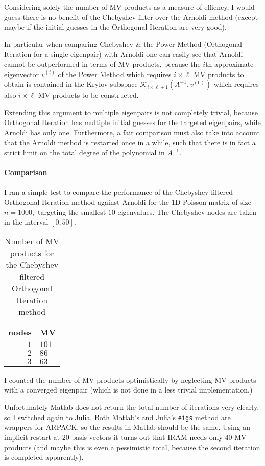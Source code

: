 \documentclass[a4paper]{article}
\newcommand{\ra}[1]{\renewcommand{\arraystretch}{#1}}
\begin{document}
   Considering solely the number of MV products as a measure of effiency, I would guess there is no benefit of the Chebyshev filter over the Arnoldi method (except maybe if the initial guesses in the Orthogonal Iteration are very good). 

   In particular when comparing Chebyshev \& the Power Method (Orthogonal Iteration for a single eigenpair) with Arnoldi one can easily see that Arnoldi cannot be outperformed in terms of MV products, because the $i$th approximate eigenvector $v^{(i)}$ of the Power Method which requires $i \times \ell$ MV products to obtain is contained in the Krylov subspace $\mathcal{K}_{i \times \ell + 1}(A^{-1}, v^{(0)})$ which requires also $i \times \ell$ MV products to be constructed.

   Extending this argument to multiple eigenpairs is not completely trivial, because Orthogonal Iteration has multiple initial guesses for the targeted eigenpairs, while Arnoldi has only one. Furthermore, a fair comparison must also take into account that the Arnoldi method is restarted once in a while, such that there is in fact a strict limit on the total degree of the polynomial in $A^{-1}.$

   \paragraph{Comparison} I ran a simple test to compare the performance of the Chebyshev filtered Orthogonal Iteration method against Arnoldi for the 1D Poisson matrix of size $n = 1000,$ targeting the smallest $10$ eigenvalues. The Chebyshev nodes are taken in the interval $[0, 50].$

  \begin{table}[h]
  \ra{1.3}
  \centering
  \label{my-label}
  \begin{tabular}{rl}
  nodes & MV  \\\midrule
  $1$ & $101$ \\
  $2$ & $86$  \\
  $3$ & $63$ 
  \end{tabular}
  \caption{Number of MV products for the Chebyshev filtered Orthogonal Iteration method}
  \end{table}

  I counted the number of MV products optimistically by neglecting MV products with a converged eigenpair (which is not done in a less trivial implementation.)

  Unfortunately Matlab does not return the total number of iterations very clearly, so I switched again to Julia. Both Matlab's and Julia's {\tt eigs} method are wrappers for ARPACK, so the results in Matlab should be the same. Using an implicit restart at $20$ basis vectors it turns out that IRAM needs only 40 MV products (and maybe this is even a pessimistic total, because the second iteration is completed apparently).
\end{document}
